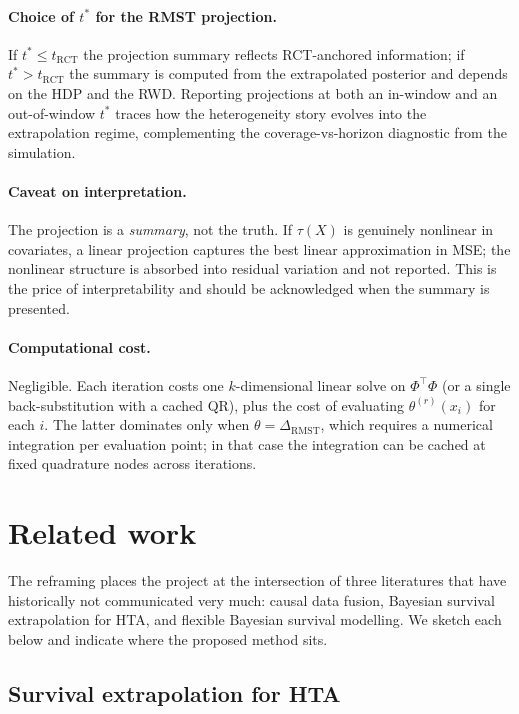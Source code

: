 \documentclass[11pt]{article}
\newcommand{\X}{X}
\newcommand{\tauf}{\tau}
\newcommand{\RCT}{\mathrm{RCT}}
\newcommand{\RMST}{\mathrm{RMST}}
\begin{document}
\paragraph{Choice of $t^{*}$ for the RMST projection.} If $t^{*} \leq
t_{\RCT}$ the projection summary reflects RCT-anchored information; if
$t^{*} > t_{\RCT}$ the summary is computed from the extrapolated posterior
and depends on the HDP and the RWD. Reporting projections at both an
in-window and an out-of-window $t^{*}$ traces how the heterogeneity story
evolves into the extrapolation regime, complementing the
coverage-vs-horizon diagnostic from the simulation.

\paragraph{Caveat on interpretation.} The projection is a \emph{summary},
not the truth. If $\tauf(\X)$ is genuinely nonlinear in covariates, a
linear projection captures the best linear approximation in MSE; the
nonlinear structure is absorbed into residual variation and not reported.
This is the price of interpretability and should be acknowledged when the
summary is presented.

\paragraph{Computational cost.} Negligible. Each iteration costs one
$k$-dimensional linear solve on $\Phi^{\top}\Phi$ (or a single
back-substitution with a cached QR), plus the cost of evaluating
$\theta^{(r)}(x_{i})$ for each $i$. The latter dominates only when
$\theta = \Delta_{\RMST}$, which requires a numerical integration per
evaluation point; in that case the integration can be cached at fixed
quadrature nodes across iterations.

\section{Related work}

The reframing places the project at the intersection of three literatures
that have historically not communicated very much: causal data fusion,
Bayesian survival extrapolation for HTA, and flexible Bayesian survival
modelling. We sketch each below and indicate where the proposed method sits.

\subsection{Survival extrapolation for HTA}
\end{document}
